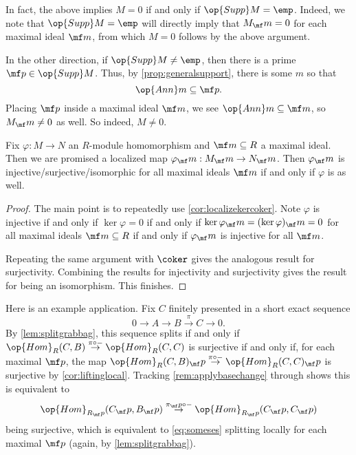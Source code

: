 \begin{remark}
	In fact, the above implies $M=0$ if and only if $\op{Supp}M=\emp$. Indeed, we note that $\op{Supp}M=\emp$ will directly imply that $M_\mf m=0$ for each maximal ideal $\mf m$, from which $M=0$ follows by the above argument.
	
	In the other direction, if $\op{Supp}M\ne\emp$, then there is a prime $\mf p\in\op{Supp}M$. Thus, by \autoref{prop:generalsupport}, there is some $m$ so that
	\[\op{Ann}m\subseteq\mf p.\]
	Placing $\mf p$ inside a maximal ideal $\mf m$, we see $\op{Ann}m\subseteq\mf m$, so $M_\mf m\ne0$ as well. So indeed, $M\ne0$.
\end{remark}
\begin{corollary} \label{cor:liftinglocal}
	Fix $\varphi:M\to N$ an $R$-module homomorphism and $\mf m\subseteq R$ a maximal ideal. Then we are promised a localized map $\varphi_\mf m:M_\mf m\to N_\mf m$. Then $\varphi_\mf m$ is injective/surjective/isomorphic for all maximal ideals $\mf m$ if and only if $\varphi$ is as well.
\end{corollary}
\begin{proof}
	The main point is to repeatedly use \autoref{cor:localizekercoker}. Note $\varphi$ is injective if and only if $\ker\varphi=0$ if and only if $\ker\varphi_\mf m=(\ker\varphi)_\mf m=0$ for all maximal ideals $\mf m\subseteq R$ if and only if $\varphi_\mf m$ is injective for all $\mf m$.
	
	Repeating the same argument with $\coker$ gives the analogous result for surjectivity. Combining the results for injectivity and surjectivity gives the result for being an isomorphism. This finishes.
\end{proof}
\begin{remark}[Nir] \label{rem:splitsifflocallysplits}
	Here is an example application. Fix $C$ finitely presented in a short exact sequence
	\[0\to A\to B\stackrel\pi\to C\to 0.\tag{$*$}\label{eq:someses}\]
	By \autoref{lem:splitgrabbag}, this sequence splits if and only if $\op{Hom}_R(C,B)\stackrel{\pi\circ-}\to\op{Hom}_R(C,C)$ is surjective if and only if, for each maximal $\mf p$, the map $\op{Hom}_R(C,B)_\mf p\stackrel{\pi\circ-}\to\op{Hom}_R(C,C)_\mf p$ is surjective by \autoref{cor:liftinglocal}. Tracking \autoref{rem:applybasechange} through shows this is equivalent to
	\[\op{Hom}_{R_\mf p}(C_\mf p,B_\mf p)\stackrel{\pi_\mf p\circ-}\to\op{Hom}_{R_\mf p}(C_\mf p,C_\mf p)\]
	being surjective, which is equivalent to \autoref{eq:someses} splitting locally for each maximal $\mf p$ (again, by \autoref{lem:splitgrabbag}).
\end{remark}
